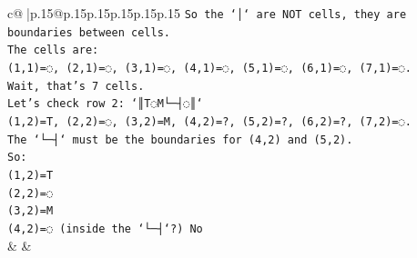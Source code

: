 \documentclass{article}
\begin{document}
{\begin{supertabular}{c@{$\;$}|p{.15\linewidth}@{}p{.15\linewidth}p{.15\linewidth}p{.15\linewidth}p{.15\linewidth}p{.15\linewidth}}
{{{\texttt{So the `│` are NOT cells, they are boundaries between cells.} \\
\texttt{The cells are:} \\
\texttt{(1,1)=◌, (2,1)=◌, (3,1)=◌, (4,1)=◌, (5,1)=◌, (6,1)=◌, (7,1)=◌.} \\
\texttt{Wait, that's 7 cells.} \\
\texttt{Let's check row 2: `║T◌M└─┤◌║`} \\
\texttt{(1,2)=T, (2,2)=◌, (3,2)=M, (4,2)=?, (5,2)=?, (6,2)=?, (7,2)=◌.} \\
\texttt{The `└─┤` must be the boundaries for (4,2) and (5,2).} \\
\texttt{So:} \\
\texttt{(1,2)=T} \\
\texttt{(2,2)=◌} \\
\texttt{(3,2)=M} \\
\texttt{(4,2)=◌ (inside the `└─┤`?) No} \\
            }
        }
    }
    & & \\ \\


\end{supertabular}}
\end{document}
